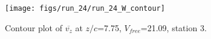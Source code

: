 \begin{figure}[H]
\centering
\texttt{[image: figs/run\_24/run\_24\_W\_contour]}
\caption{Contour plot of $\overline{v_{z}}$ at $z/c$=7.75, $V_{free}$=21.09, station 3.}
\label{fig:run_24_W_contour}
\end{figure}


